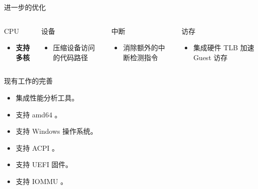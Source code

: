 \documentclass{beamer}
\begin{document}
\begin{frame}{进一步的优化}
	\begin{columns}[T,onlytextwidth]
		\begin{exampleblock}{CPU}
			\begin{itemize}
				\item \textbf{支持多核}
			\end{itemize}
		\end{exampleblock}

		\begin{exampleblock}{设备}
			\begin{itemize}
				\item 压缩设备访问的代码路径
			\end{itemize}
		\end{exampleblock}

		\begin{exampleblock}{中断}
			\begin{itemize}
				\item 消除额外的中断检测指令
			\end{itemize}
		\end{exampleblock}

		\begin{exampleblock}{访存}
			\begin{itemize}
				\item 集成硬件 TLB 加速 Guest 访存
			\end{itemize}
		\end{exampleblock}
	\end{columns}
\end{frame}

\begin{frame}{现有工作的完善}
	\begin{itemize}
		\item 集成性能分析工具。
		\item 支持 amd64 。
		\item 支持 Windows 操作系统。
		\item 支持 ACPI 。
		\item 支持 UEFI 固件。
		\item 支持 IOMMU 。
	\end{itemize}
\end{frame}
\end{document}
